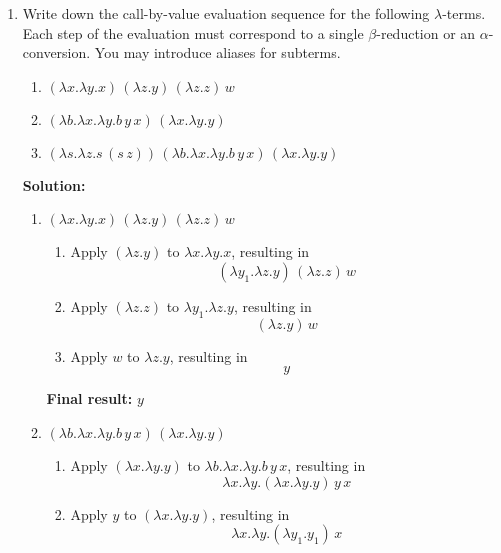 \documentclass{article}
\begin{document}
\begin{enumerate}
    
    
    \item Write down the call-by-value evaluation sequence for the following $\lambda$-terms. Each step of the evaluation must correspond to a single $\beta$-reduction or an $\alpha$-conversion. You may introduce aliases for subterms.
    \begin{enumerate}
        \item $(\lambda x.\lambda y.x) \, (\lambda z.y) \, (\lambda z.z) \, w$
        \item $(\lambda b.\lambda x.\lambda y.b \, y \, x) \, (\lambda x.\lambda y.y)$
        \item $(\lambda s.\lambda z.s \, (s \, z)) \, (\lambda b.\lambda x.\lambda y.b \, y \, x) \, (\lambda x.\lambda y.y)$
    \end{enumerate}

    \textbf{Solution:}

    \begin{enumerate}
        \item $(\lambda x.\lambda y.x) \, (\lambda z.y) \, (\lambda z.z) \, w$

        \begin{enumerate}
            \item Apply \( (\lambda z.y) \) to \( \lambda x.\lambda y.x \), resulting in \\
\[
(\lambda y_1.\lambda z.y) \, (\lambda z.z) \, w
\]
            \item Apply \( (\lambda z.z) \) to \( \lambda y_1.\lambda z.y \), resulting in \\
\[
(\lambda z.y) \, w
\]

            \item Apply \( w \) to \( \lambda z.y \), resulting in \\
\[
y
\]

        \end{enumerate}
        
        \textbf{Final result: } \( y \)
        
        \item $(\lambda b.\lambda x.\lambda y.b \, y \, x) \, (\lambda x.\lambda y.y)$

        \begin{enumerate}
            \item Apply \( (\lambda x.\lambda y.y) \) to \( \lambda b.\lambda x.\lambda y.b \, y \, x \), resulting in \\
\[
\lambda x.\lambda y.(\lambda x.\lambda y.y) \, y \, x
\]
            \item Apply \( y \) to \( (\lambda x.\lambda y.y) \), resulting in \\
\[
\lambda x.\lambda y.(\lambda y_1.y_1) \, x
\]


\end{enumerate}
\end{enumerate}
\end{enumerate}
\end{document}
